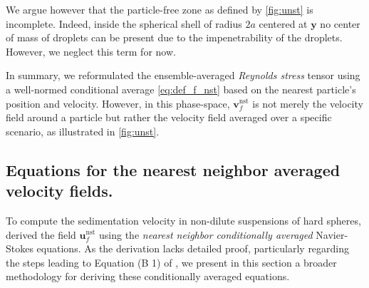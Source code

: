 We argue however that the particle-free zone as defined by \ref{fig:unst} is incomplete. 
Indeed, inside the spherical shell of radius $2a$ centered at $\textbf{y}$ no center of mass of droplets can be present due to the impenetrability of the droplets. 
However, we neglect this term for now. 


In summary, we reformulated the ensemble-averaged \textit{Reynolds stress} tensor using a well-normed conditional average \eqref{eq:def_f_nst} based on the nearest particle's position and velocity. 
However, in this phase-space, $\textbf{v}_f^\text{nst}$ is not merely the velocity field around a particle but rather the velocity field averaged over a specific scenario, as illustrated in \ref{fig:unst}. 

\subsection{Equations for the nearest neighbor averaged velocity fields. }

To compute the sedimentation velocity in non-dilute suspensions of hard spheres, \citet[Appendix B]{zhang2021ensemble} derived the field $\textbf{u}_f^\text{nst}$ using the \textit{nearest neighbor conditionally averaged} Navier-Stokes equations. As the derivation lacks detailed proof, particularly regarding the steps leading to Equation (B 1) of \citet{zhang2021ensemble}, we present in this section a broader methodology for deriving these conditionally averaged equations. 

